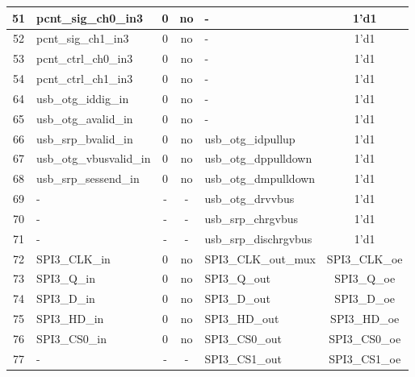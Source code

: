 \begin{longtable}[c]{|c|l|c|c|l|c|}
 51  &      pcnt\_sig\_ch0\_in3  &  0  &   no  &                       -  &               1'd1  \\\hline
 52  &      pcnt\_sig\_ch1\_in3  &  0  &   no  &                       -  &               1'd1  \\\hline
 53  &     pcnt\_ctrl\_ch0\_in3  &  0  &   no  &                       -  &               1'd1  \\\hline
 54  &     pcnt\_ctrl\_ch1\_in3  &  0  &   no  &                       -  &               1'd1  \\\hline
 64  &      usb\_otg\_iddig\_in  &  0  &   no  &                       -  &               1'd1  \\\hline
 65  &     usb\_otg\_avalid\_in  &  0  &   no  &                       -  &               1'd1  \\\hline
 66  &     usb\_srp\_bvalid\_in  &  0  &   no  &      usb\_otg\_idpullup  &               1'd1  \\\hline
 67  &  usb\_otg\_vbusvalid\_in  &  0  &   no  &    usb\_otg\_dppulldown  &               1'd1  \\\hline
 68  &    usb\_srp\_sessend\_in  &  0  &   no  &    usb\_otg\_dmpulldown  &               1'd1  \\\hline
 69  &                        -  &  -  &    -  &       usb\_otg\_drvvbus  &               1'd1  \\\hline
 70  &                        -  &  -  &    -  &      usb\_srp\_chrgvbus  &               1'd1  \\\hline
 71  &                        -  &  -  &    -  &   usb\_srp\_dischrgvbus  &               1'd1  \\\hline
 72  &            SPI3\_CLK\_in  &  0  &   no  &     SPI3\_CLK\_out\_mux  &      SPI3\_CLK\_oe  \\\hline
 73  &              SPI3\_Q\_in  &  0  &   no  &            SPI3\_Q\_out  &        SPI3\_Q\_oe  \\\hline
 74  &              SPI3\_D\_in  &  0  &   no  &            SPI3\_D\_out  &        SPI3\_D\_oe  \\\hline
 75  &             SPI3\_HD\_in  &  0  &   no  &           SPI3\_HD\_out  &       SPI3\_HD\_oe  \\\hline
 76  &            SPI3\_CS0\_in  &  0  &   no  &          SPI3\_CS0\_out  &      SPI3\_CS0\_oe  \\\hline
 77  &                        -  &  -  &    -  &          SPI3\_CS1\_out  &      SPI3\_CS1\_oe  \\\hline

\end{longtable}
